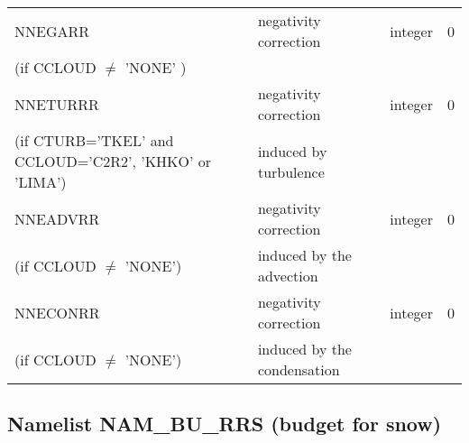 \begin{longtable} {|p{}|p{}|>{\centering}p{}|p{}<{\centering}|}
NNEGARR   & negativity correction & integer  &  0 \index{NNEGARR!\innam{NAM\_BU\_RRR}}\\ \nopagebreak
(if CCLOUD $\neq$ 'NONE' )& &   &  \\\hline
NNETURRR  &negativity correction   & integer  &  0 \index{NNETURRR!\innam{NAM\_BU\_RRR}}\\ \nopagebreak
(if CTURB='TKEL' and CCLOUD='C2R2', 'KHKO' or 'LIMA')   &induced by turbulence   &       &   \\\hline
NNEADVRR  & negativity correction  & integer  &  0 \index{NNEADVRR!\innam{NAM\_BU\_RRR}}\\ \nopagebreak
(if CCLOUD $\neq$ 'NONE') & induced by the advection&   &  \\\hline
NNECONRR  &negativity correction    & integer  &  0 \index{NNECONRR!\innam{NAM\_BU\_RRR}}\\ \nopagebreak
(if CCLOUD $\neq$ 'NONE') &induced by the condensation &   &  \\\hline
\end{longtable}

\subsection{Namelist NAM\_BU\_RRS (budget for snow)}

